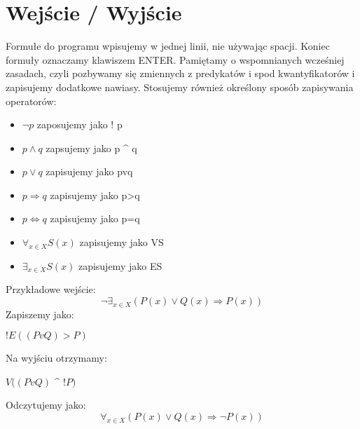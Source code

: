 ﻿\documentclass{article}
\begin{document}
\section{Wejście / Wyjście}
Formułe do programu wpisujemy w jednej linii, nie używając spacji. Koniec formuły oznaczamy klawiszem ENTER. \newline
Pamiętamy o wspomnianych wcześniej zasadach, czyli pozbywamy się zmiennych z predykatów i spod kwantyfikatorów i zapisujemy dodatkowe nawiasy. \newline
Stosujemy również określony sposób zapisywania operatorów:
\begin{itemize}
    \item $\neg p$ zaposujemy jako $!$ p
    \item $ p \wedge q $ zapsujemy jako p \^{} q
    \item $ p \vee q $ zapisujemy jako pvq
    \item $ p \Rightarrow q $ zapisujemy jako p\textgreater q
    \item $ p \Leftrightarrow q $ zapisujemy jako p=q
    \item $ \forall _{x\in X} S(x) $ zapisujemy jako VS
    \item $ \exists _{x\in X} S(x) $ zapisujemy jako ES
\end{itemize}
\pagebreak
Przykładowe wejście:
    \[\neg\exists _{x\in X} (P(x) \vee Q(x) \Rightarrow P(x))\]
\qquad Zapiszemy jako:
\begin{center}
    $!E((PvQ)>P)$
\end{center}
Na wyjściu otrzymamy:
\begin{center}
    $V((PvQ)$ \^{} $!P)$
\end{center}
Odczytujemy jako:
    \[\forall _{x\in X} (P(x) \vee Q(x) \Rightarrow \neg P(x)) \]
\end{document}
